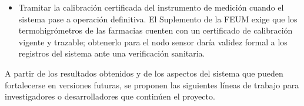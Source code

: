 \begin{itemize}
    \item Tramitar la calibración certificada del instrumento de medición cuando el sistema pase a operación definitiva. El Suplemento de la FEUM exige que los termohigrómetros de las farmacias cuenten con un certificado de calibración vigente y trazable; obtenerlo para el nodo sensor daría validez formal a los registros del sistema ante una verificación sanitaria.

\end{itemize}



A partir de los resultados obtenidos y de los aspectos del sistema que pueden fortalecerse en versiones futuras, se proponen las siguientes líneas de trabajo para investigadores o desarrolladores que continúen el proyecto.

